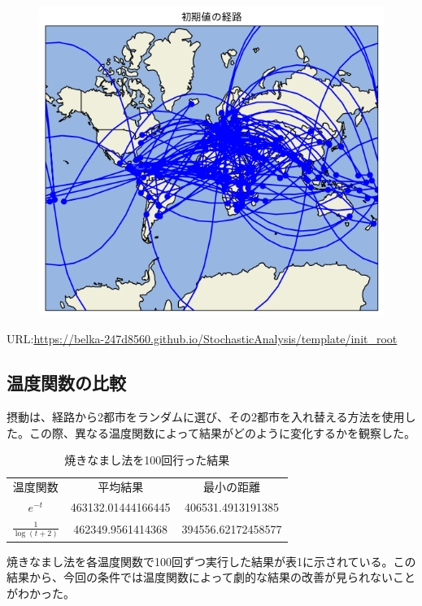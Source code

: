 \documentclass[a4paper,11pt]{ltjsarticle}
\begin{document}
\begin{figure}[H]
    \begin{center}
        \includegraphics[scale=0.7]{img/init_root.png}
    \end{center}
\end{figure}
URL:\url{https://belka-247d8560.github.io/StochasticAnalysis/template/init_root}

\subsection{温度関数の比較}
摂動は、経路から2都市をランダムに選び、その2都市を入れ替える方法を使用した。この際、異なる温度関数によって結果がどのように変化するかを観察した。\\
\begin{table}[H]
    \centering
    \caption{焼きなまし法を100回行った結果}
    \label{tab:hogehoge}
    \begin{tabular}{ccc}
        温度関数 & 平均結果 & 最小の距離\\
        $e^{-t}$ & 463132.01444166445 & 406531.4913191385\\
        $\frac{1}{\log{(t+2)}}$ & 462349.9561414368 & 394556.62172458577
    \end{tabular}
\end{table}
焼きなまし法を各温度関数で100回ずつ実行した結果が表1に示されている。この結果から、今回の条件では温度関数によって劇的な結果の改善が見られないことがわかった。
\end{document}
